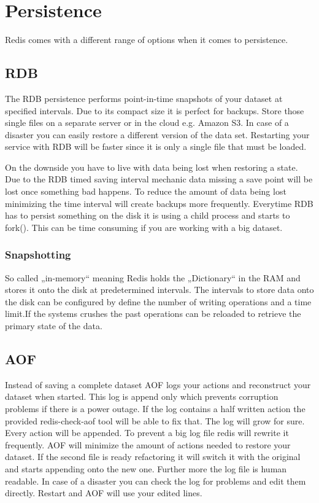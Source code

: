 \chapter{Persistence}
Redis comes with a different range of options when it comes to persistence. 

\section{RDB}
The RDB persistence performs point-in-time snapshots of your dataset at specified intervals.
Due to its compact size it is perfect for backups. Store those single files on a separate server or in the cloud e.g. Amazon S3.
In case of a disaster you can easily restore a different version of the data set.
Restarting your service with RDB will be faster since it is only a single file that must be loaded.

On the downside you have to live with data being lost when restoring a state. Due to the RDB timed saving interval mechanic data missing a save point will be lost once something bad happens.
To reduce the amount of data being lost minimizing the time interval will create backups more frequently.
Everytime RDB has to persist something on the disk it is using a child process and starts to fork(). This can be time consuming if you are working with a big dataset.

\subsection{Snapshotting}
So called „in-memory“ meaning Redis holds the „Dictionary“ in the RAM and stores it onto the disk at predetermined intervals. The intervals to store data onto the disk can be configured by define the number of writing operations and a time limit.If the systems crushes the past operations can be reloaded to retrieve the primary state of the data.

\section{AOF}
Instead of saving a complete dataset AOF logs your actions and reconstruct your dataset when started.
This log is append only which prevents corruption problems if there is a power outage. If the log contains a half written action the provided redis-check-aof tool will be able to fix that.
The log will grow for sure. Every action will be appended. To prevent a big log file redis will rewrite it frequently. AOF will minimize the amount of actions needed to restore your dataset. If the second file is ready refactoring it will switch it with the original and starts appending onto the new one.
Further more the log file is human readable. In case of a disaster you can check the log for problems and edit them directly. Restart and AOF will use your edited lines.

